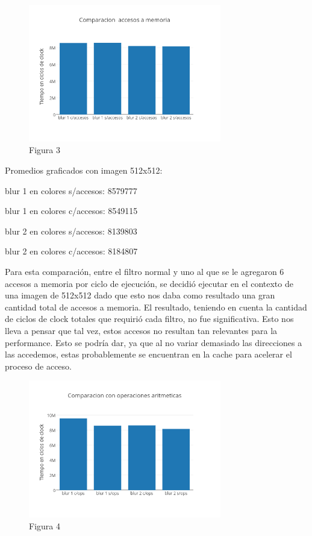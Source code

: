 \documentclass[a4paper]{article}
\begin{document}
\begin{figure}[h]
  \centering
    \includegraphics[width=0.75\textwidth]{imagenes/ComparacionAccesosAMemoriaBlurColores.png}
  \caption{Figura 3}
  \label{fig:graficoblur3}
\end{figure}
 \FloatBarrier

Promedios graficados con imagen 512x512:

blur 1 en colores s/accesos: 8579777

blur 1 en colores c/accesos: 8549115

blur 2 en colores s/accesos: 8139803

blur 2 en colores c/accesos: 8184807

Para esta comparación, entre el filtro normal y uno al que se le agregaron 6 accesos a memoria por ciclo de ejecución, se decidió ejecutar en el contexto de una imagen de 512x512 dado que esto nos daba como resultado una gran cantidad total de accesos a memoria. El resultado, teniendo en cuenta la cantidad de ciclos de clock totales que requirió cada filtro, no fue significativa. Esto nos lleva a pensar que tal vez, estos accesos no resultan tan relevantes para la performance. Esto se podría dar, ya que al no variar demasiado las direcciones a las accedemos, estas probablemente se encuentran en la cache para acelerar el proceso de acceso. 

\begin{figure}[h]
  \centering
    \includegraphics[width=0.75\textwidth]{imagenes/ComparacionConOperacionesAritmeticasBlurColores.png}
  \caption{Figura 4}
  \label{fig:graficoblur4}
\end{figure}
 \FloatBarrier
\end{document}
